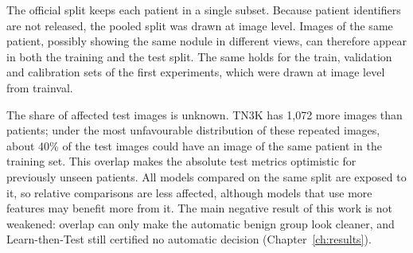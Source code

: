 The official split keeps each patient in a single subset. Because patient identifiers are not
released, the pooled split was drawn at image level. Images of the same patient, possibly showing
the same nodule in different views, can therefore appear in both the training and the test
split. The same holds for the train, validation and calibration sets of the first experiments,
which were drawn at image level from trainval.

The share of affected test images is unknown. TN3K has 1,072 more images than patients; under
the most unfavourable distribution of these repeated images, about 40\% of the test images could
have an image of the same patient in the training set. This overlap makes the absolute test
metrics optimistic for previously unseen patients. All models compared on the same split are
exposed to it, so relative comparisons are less affected, although models that use more
features may benefit more from it. The main negative result of this work is not weakened:
overlap can only make the automatic benign group look cleaner, and Learn-then-Test still
certified no automatic decision (Chapter~\ref{ch:results}).

